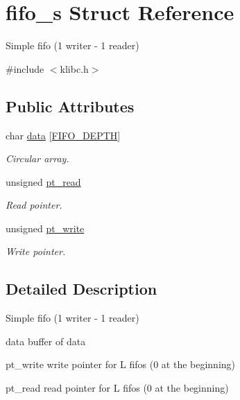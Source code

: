 \hypertarget{structfifo__s}{\section{fifo\-\_\-s Struct Reference}
\label{structfifo__s}
}


Simple fifo (1 writer -\/ 1 reader)  




{\ttfamily \#include $<$klibc.\-h$>$}

\subsection*{Public Attributes}
\begin{DoxyCompactItemize}
\item 
char \hyperlink{structfifo__s_a404947915e9c75b5cbbd89187eb80af5}{data} \mbox{[}\hyperlink{klibc_8h_ab297050456738a4bc51658025f2521c6}{F\-I\-F\-O\-\_\-\-D\-E\-P\-T\-H}\mbox{]}
\begin{DoxyCompactList}\small\item\em Circular array. \end{DoxyCompactList}\item 
unsigned \hyperlink{structfifo__s_a19b8017ce5eae056136497331734326c}{pt\-\_\-read}
\begin{DoxyCompactList}\small\item\em Read pointer. \end{DoxyCompactList}\item 
unsigned \hyperlink{structfifo__s_a32bc3dae5f99ee248fae7d2fde0f2a46}{pt\-\_\-write}
\begin{DoxyCompactList}\small\item\em Write pointer. \end{DoxyCompactList}\end{DoxyCompactItemize}


\subsection{Detailed Description}
Simple fifo (1 writer -\/ 1 reader) 


\begin{DoxyItemize}
\item data buffer of data
\item pt\-\_\-write write pointer for L fifos (0 at the beginning)
\item pt\-\_\-read read pointer for L fifos (0 at the beginning)
\end{DoxyItemize}

